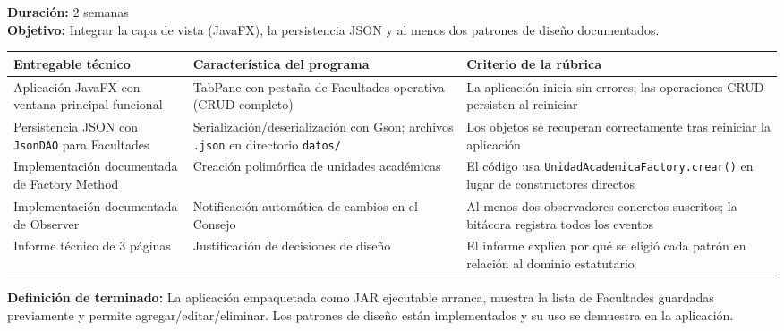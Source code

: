\begin{tcolorbox}[sprintBox, title={Sprint 7 — Interfaz gráfica, persistencia y patrones de diseño}]
\textbf{Duración:} 2 semanas\\[4pt]
\textbf{Objetivo:} Integrar la capa de vista (JavaFX), la persistencia JSON y al menos
dos patrones de diseño documentados.

\vspace{6pt}
\begin{tabularx}{\linewidth}{@{}L{4cm}L{4cm}L{4.5cm}@{}}
\toprule
\textbf{Entregable técnico} & \textbf{Característica del programa} & \textbf{Criterio de la rúbrica} \\
\midrule
Aplicación JavaFX con ventana principal funcional &
  TabPane con pestaña de Facultades operativa (CRUD completo) &
  La aplicación inicia sin errores; las operaciones CRUD persisten al reiniciar \\
\addlinespace
Persistencia JSON con \texttt{JsonDAO} para Facultades &
  Serialización/deserialización con Gson; archivos \texttt{.json} en directorio \texttt{datos/} &
  Los objetos se recuperan correctamente tras reiniciar la aplicación \\
\addlinespace
Implementación documentada de Factory Method &
  Creación polimórfica de unidades académicas &
  El código usa \texttt{UnidadAcademicaFactory.crear()} en lugar de constructores directos \\
\addlinespace
Implementación documentada de Observer &
  Notificación automática de cambios en el Consejo &
  Al menos dos observadores concretos suscritos; la bitácora registra todos los eventos \\
\addlinespace
Informe técnico de 3 páginas &
  Justificación de decisiones de diseño &
  El informe explica por qué se eligió cada patrón en relación al dominio estatutario \\
\bottomrule
\end{tabularx}

\vspace{8pt}
\textbf{Definición de terminado:} La aplicación empaquetada como JAR ejecutable arranca,
muestra la lista de Facultades guardadas previamente y permite agregar/editar/eliminar.
Los patrones de diseño están implementados y su uso se demuestra en la aplicación.
\end{tcolorbox}

\vspace{10pt}


